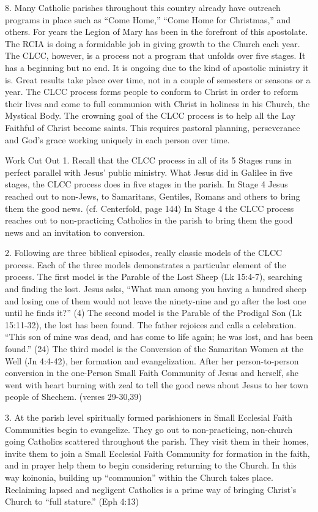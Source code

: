 \documentclass[oneside]{book}
\begin{document}
8. Many Catholic parishes throughout this country already have outreach programs
in place such as ``Come Home,'' ``Come Home for Christmas,'' and others. For
years the Legion of Mary has been in the forefront of this apostolate. The RCIA
is doing a formidable job in giving growth to the Church each year. The CLCC,
however, is a process not a program that unfolds over five stages. It has a
beginning but no end. It is ongoing due to the kind of apostolic ministry it
is. Great results take place over time, not in a couple of semesters or seasons
or a year.
The CLCC process forms people to conform to Christ in order to reform their
lives and come to full communion with Christ in holiness in his Church, the
Mystical Body. The crowning goal of the CLCC process is to help all the Lay
Faithful of Christ become saints. This requires pastoral planning, perseverance
and God's grace working uniquely in each person over time.

Work Cut Out
1. Recall that the CLCC process in all of its 5 Stages runs in perfect parallel
with Jesus' public ministry. What Jesus did in Galilee in five stages, the CLCC
process does in five stages in the parish. In Stage 4 Jesus reached out to
non-Jews, to Samaritans, Gentiles, Romans and others to bring them the good
news. (cf. Centerfold, page 144) In Stage 4 the CLCC process reaches out to
non-practicing Catholics in the parish to bring them the good news and an
invitation to conversion.

2. Following are three biblical episodes, really classic models of the CLCC
process. Each of the three models demonstrates a particular element of the
process.
The first model is the Parable of the Lost Sheep (Lk 15:4-7), searching and
finding the lost. Jesus asks, ``What man among you having a hundred sheep and
losing one of them would not leave the ninety-nine and go after the lost one
until he finds it?'' (4)
The second model is the Parable of the Prodigal Son (Lk 15:11-32), the lost has
been found. The father rejoices and calls a celebration. ``This son of mine was
dead, and has come to life again; he was lost, and has been found.'' (24)
The third model is the Conversion of the Samaritan Women at the Well (Jn
4:4-42), her formation and evangelization. After her person-to-person
conversion in the one-Person Small Faith Community of Jesus and herself, she
went with heart burning with zeal to tell the good news about Jesus to her town
people of Shechem. (verses 29-30,39)

3. At the parish level spiritually formed parishioners in Small Ecclesial Faith
Communities begin to evangelize. They go out to non-practicing, non-church going
Catholics scattered throughout the parish. They visit them in their homes,
invite them to join a Small Ecclesial Faith Community for formation in the
faith, and in prayer help them to begin considering returning to the Church. In
this way koinonia, building up ``communion'' within the Church takes
place. Reclaiming lapsed and negligent Catholics is a prime way of bringing
Christ's Church to ``full stature.'' (Eph 4:13)
\end{document}
